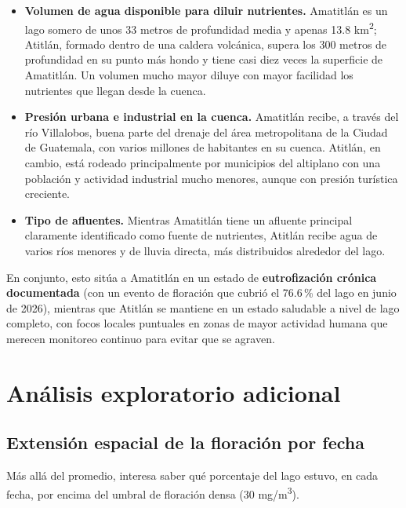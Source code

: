 \documentclass[11pt]{article}
\begin{document}
\begin{itemize}
    \item \textbf{Volumen de agua disponible para diluir nutrientes.} Amatitl\'an es un lago somero de unos 33 metros de profundidad media y apenas 13.8 km\textsuperscript{2}; Atitl\'an, formado dentro de una caldera volc\'anica, supera los 300 metros de profundidad en su punto m\'as hondo y tiene casi diez veces la superficie de Amatitl\'an. Un volumen mucho mayor diluye con mayor facilidad los nutrientes que llegan desde la cuenca.
    \item \textbf{Presi\'on urbana e industrial en la cuenca.} Amatitl\'an recibe, a trav\'es del r\'io Villalobos, buena parte del drenaje del \'area metropolitana de la Ciudad de Guatemala, con varios millones de habitantes en su cuenca. Atitl\'an, en cambio, est\'a rodeado principalmente por municipios del altiplano con una poblaci\'on y actividad industrial mucho menores, aunque con presi\'on tur\'istica creciente.
    \item \textbf{Tipo de afluentes.} Mientras Amatitl\'an tiene un afluente principal claramente identificado como fuente de nutrientes, Atitl\'an recibe agua de varios r\'ios menores y de lluvia directa, m\'as distribuidos alrededor del lago.
\end{itemize}

En conjunto, esto sit\'ua a Amatitl\'an en un estado de \textbf{eutrofizaci\'on cr\'onica documentada} (con un evento de floraci\'on que cubri\'o el 76.6\,\% del lago en junio de 2026), mientras que Atitl\'an se mantiene en un estado saludable a nivel de lago completo, con focos locales puntuales en zonas de mayor actividad humana que merecen monitoreo continuo para evitar que se agraven.

\section{An\'alisis exploratorio adicional}

\subsection{Extensi\'on espacial de la floraci\'on por fecha}

M\'as all\'a del promedio, interesa saber qu\'e porcentaje del lago estuvo, en cada fecha, por encima del umbral de floraci\'on densa (30 mg/m\textsuperscript{3}).
\end{document}
